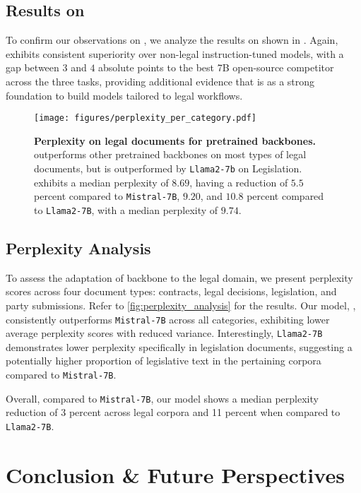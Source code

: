 \subsection{Results on \legalmmlu{}}

To confirm our observations on \legalbench{}, we analyze the results on \legalmmlu{} shown in . Again, \ourmodelift{} exhibits consistent superiority over non-legal instruction-tuned models, with a gap between $3$ and $4$ absolute points to the best 7B open-source competitor across the three tasks, providing additional evidence that \ourmodelift{} is as a strong foundation to build models tailored to legal workflows.
\begin{figure}[h]
        \centering
        \texttt{[image: figures/perplexity\_per\_category.pdf]}
        \caption{\textbf{Perplexity on legal documents for pretrained backbones.} \ourmodelift{} outperforms other pretrained backbones on most types of legal documents, but is outperformed by \texttt{Llama2-7b} on Legislation.
        \ourmodelift{} exhibits a median perplexity of $8.69$, having a reduction of $5.5$ percent compared to \texttt{Mistral-7B}, $9.20$, and $10.8$ percent compared to \texttt{Llama2-7B}, with a median perplexity of $9.74$.
        }
        \label{fig:perplexity_analysis}
\end{figure}

\subsection{Perplexity Analysis} 
To assess the adaptation of \ourmodel{} backbone to the legal domain, we present perplexity scores across four document types: contracts, legal decisions, legislation, and party submissions. Refer to \autoref{fig:perplexity_analysis} for the results. Our model, \ourmodel{}, consistently outperforms \texttt{Mistral-7B} across all categories, exhibiting lower average perplexity scores with reduced variance. Interestingly, \texttt{Llama2-7B} demonstrates lower perplexity specifically in legislation documents, suggesting a potentially higher proportion of legislative text in the pertaining corpora compared to \texttt{Mistral-7B}.

Overall, compared to \texttt{Mistral-7B}, our model shows a median perplexity reduction of 3 percent across legal corpora and 11 percent when compared to \texttt{Llama2-7B}.

    
\section{Conclusion \& Future Perspectives}

